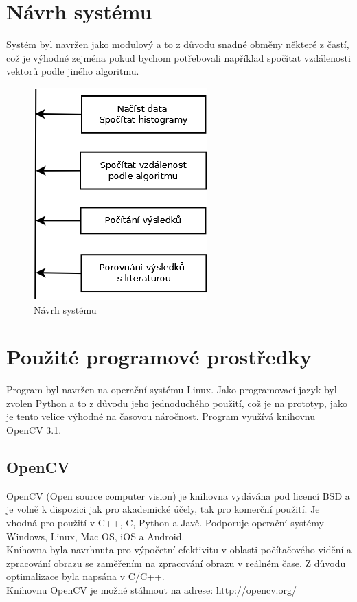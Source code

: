\documentclass[czech,BP]{thesiskiv}
\begin{document}
\chapter{Návrh systému}
Systém byl navržen jako modulový a to z důvodu snadné obměny některé z častí, což je výhodné zejména pokud bychom potřebovali například spočítat vzdálenosti vektorů podle jiného algoritmu. 

\begin{figure}[h]
		\centering
		\includegraphics[width=253px]{./img/graf.png}	
		\caption{Návrh systému}
\end{figure}


\chapter{Použité programové prostředky}
Program byl navržen na operační systému Linux. Jako programovací jazyk byl zvolen Python a to z důvodu jeho jednoduchého použití, což je na prototyp, jako je tento velice výhodné na časovou náročnost. Program využívá knihovnu OpenCV 3.1. 
  
\section{OpenCV}
OpenCV (Open source computer vision) je knihovna vydávána pod licencí BSD a je volně k dispozici jak pro akademické účely, tak pro komerční použití. Je vhodná pro použití v C++, C, Python a Javě. Podporuje operační systémy Windows, Linux, Mac OS, iOS a Android.
\\
Knihovna byla navrhnuta pro výpočetní efektivitu v oblasti počítačového vidění a zpracování obrazu se zaměřením na zpracování obrazu v reálném čase. Z důvodu optimalizace byla napsána v C/C++. 
\\
Knihovnu OpenCV je možné stáhnout na adrese: http://opencv.org/
\end{document}

